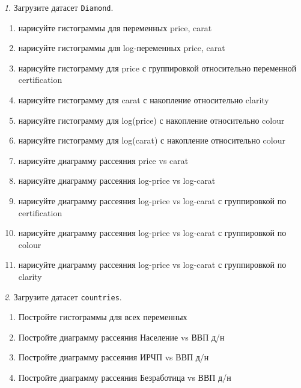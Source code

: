\documentclass[12pt]{article}
\theoremstyle{remark}
\newtheorem{exercise}{}[section]
\begin{document}
\begin{exercise}
Загрузите датасет \texttt{Diamond}.
\begin{enumerate}
	\item нарисуйте гистограммы для переменных price, carat
	\item нарисуйте гистограммы для log-переменных price, carat
	\item нарисуйте гистограмму для price с группировкой относительно переменной certification
	\item нарисуйте гистограмму для carat с накопление относительно clarity 
	\item нарисуйте гистограмму для log(price) с накопление  относительно colour
	\item нарисуйте гистограмму для log(carat) с накопление относительно colour
	\item нарисуйте диаграмму рассеяния price vs carat
	\item нарисуйте диаграмму рассеяния log-price vs log-carat
	\item нарисуйте диаграмму рассеяния log-price vs log-carat с группировкой по certification
	\item нарисуйте диаграмму рассеяния log-price vs log-carat с группировкой по colour
	\item нарисуйте диаграмму рассеяния log-price vs log-carat с группировкой по clarity
\end{enumerate}
\end{exercise}

\begin{exercise}
Загрузите датасет \texttt{countries}.
\begin{enumerate}
	\item Постройте гистограммы для всех переменных
	\item Постройте диаграмму рассеяния Население vs ВВП д/н
	\item Постройте диаграмму рассеяния ИРЧП vs ВВП д/н
	\item Постройте диаграмму рассеяния Безработица vs ВВП д/н
\end{enumerate}
\end{exercise}
\end{document}
